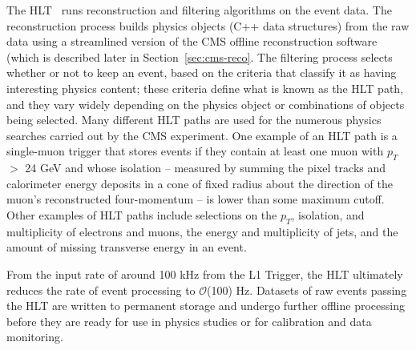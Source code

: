 The HLT~\cite{Cittolin:578006} runs reconstruction and filtering algorithms on the event data. The reconstruction process builds physics objects (C++ data structures) from the raw data using a streamlined version of the CMS offline reconstruction software (which is described later in Section~\ref{sec:cms-reco}. The filtering process selects whether or not to keep an event, based on the criteria that classify it as having interesting physics content; these criteria define what is known as the HLT path, and they vary widely depending on the physics object or combinations of objects being selected. Many different HLT paths are used for the numerous physics searches carried out by the CMS experiment. One example of an HLT path is a single-muon trigger that stores events if they contain at least one muon with $p_T$ $>$ 24 GeV and whose isolation -- measured by summing the pixel tracks and calorimeter energy deposits in a cone of fixed radius about the direction of the muon's reconstructed four-momentum -- is lower than some maximum cutoff. Other examples of HLT paths include selections on the $p_T$, isolation, and multiplicity of electrons and muons, the energy and multiplicity of jets, and the amount of missing transverse energy in an event.

From the input rate of around 100 kHz from the L1 Trigger, the HLT ultimately reduces the rate of event processing to $\mathcal{O}$(100) Hz. Datasets of raw events passing the HLT are written to permanent storage and undergo further offline processing before they are ready for use in physics studies or for calibration and data monitoring.